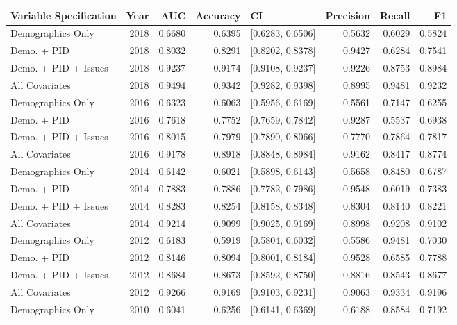 \begin{table}[ht]
\centering
\begin{tabular}{lrrrlrrr}
  \toprule
Variable Specification & Year & AUC & Accuracy & CI & Precision & Recall & F1 \\ 
  \midrule
Demographics Only & 2018 & 0.6680 & 0.6395 & [0.6283, 0.6506] & 0.5632 & 0.6029 & 0.5824 \\ 
  Demo. + PID & 2018 & 0.8032 & 0.8291 & [0.8202, 0.8378] & 0.9427 & 0.6284 & 0.7541 \\ 
  Demo. + PID + Issues & 2018 & 0.9237 & 0.9174 & [0.9108, 0.9237] & 0.9226 & 0.8753 & 0.8984 \\ 
  All Covariates & 2018 & 0.9494 & 0.9342 & [0.9282, 0.9398] & 0.8995 & 0.9481 & 0.9232 \\ 
  Demographics Only & 2016 & 0.6323 & 0.6063 & [0.5956, 0.6169] & 0.5561 & 0.7147 & 0.6255 \\ 
  Demo. + PID & 2016 & 0.7618 & 0.7752 & [0.7659, 0.7842] & 0.9287 & 0.5537 & 0.6938 \\ 
  Demo. + PID + Issues & 2016 & 0.8015 & 0.7979 & [0.7890, 0.8066] & 0.7770 & 0.7864 & 0.7817 \\ 
  All Covariates & 2016 & 0.9178 & 0.8918 & [0.8848, 0.8984] & 0.9162 & 0.8417 & 0.8774 \\ 
  Demographics Only & 2014 & 0.6142 & 0.6021 & [0.5898, 0.6143] & 0.5658 & 0.8480 & 0.6787 \\ 
  Demo. + PID & 2014 & 0.7883 & 0.7886 & [0.7782, 0.7986] & 0.9548 & 0.6019 & 0.7383 \\ 
  Demo. + PID + Issues & 2014 & 0.8283 & 0.8254 & [0.8158, 0.8348] & 0.8304 & 0.8140 & 0.8221 \\ 
  All Covariates & 2014 & 0.9214 & 0.9099 & [0.9025, 0.9169] & 0.8998 & 0.9208 & 0.9102 \\ 
  Demographics Only & 2012 & 0.6183 & 0.5919 & [0.5804, 0.6032] & 0.5586 & 0.9481 & 0.7030 \\ 
  Demo. + PID & 2012 & 0.8146 & 0.8094 & [0.8001, 0.8184] & 0.9528 & 0.6585 & 0.7788 \\ 
  Demo. + PID + Issues & 2012 & 0.8684 & 0.8673 & [0.8592, 0.8750] & 0.8816 & 0.8543 & 0.8677 \\ 
  All Covariates & 2012 & 0.9266 & 0.9169 & [0.9103, 0.9231] & 0.9063 & 0.9334 & 0.9196 \\ 
  Demographics Only & 2010 & 0.6041 & 0.6256 & [0.6141, 0.6369] & 0.6188 & 0.8584 & 0.7192 \\ 

\end{tabular}
\end{table}
